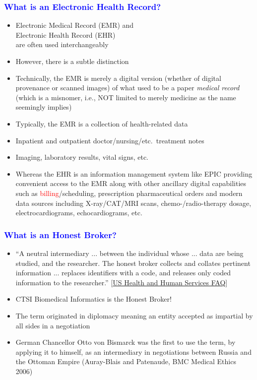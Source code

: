 \documentclass[11pt,pdftex,dvipsnames,usenames]{beamer}
\begin{document}
\begin{frame}[fragile]\frametitle{\bf\textcolor{blue}{What is an Electronic Health Record?}}

\begin{itemize}
\item Electronic Medical Record (EMR) and\\ 
Electronic Health Record (EHR)\\
are often used interchangeably
\item However, there is a subtle distinction
\item Technically, the EMR is merely a digital version (whether of
  digital provenance or scanned images) of what used to be a paper
  {\it medical record} (which is a misnomer, i.e., NOT limited to
  merely medicine as the name seemingly implies)
\item Typically, the EMR is a collection of health-related data
\item Inpatient and outpatient doctor/nursing/etc.\ treatment notes
\item Imaging, laboratory results, vital signs, etc. 
\item Whereas the EHR is an information management system like EPIC
  providing convenient access to the EMR along with other ancillary
  digital capabilities such as \textcolor{red}{billing}/scheduling,
  prescription pharmaceutical orders and modern data sources 
including X-ray/CAT/MRI scans,  chemo-/radio-therapy dosage,
  electrocardiograms, echocardiograms, etc.
\end{itemize}

\end{frame}


\begin{frame}[fragile]\frametitle{\bf\textcolor{blue}{What is an Honest Broker?}}

\begin{itemize}
\item
``A neutral intermediary ... between the individual whose ... data are being studied, and the researcher. The honest broker collects and collates pertinent information ... replaces identifiers with a code, and releases only coded information to the researcher.''
 \textcolor{PineGreen}{[\href{https://www.hhs.gov/ohrp/sachrp-committee/recommendations/2011-october-13-letter-attachment-d/index.html}{US
     Health and Human Services FAQ}]}
\item CTSI Biomedical Informatics is the Honest Broker!
\item The term originated in diplomacy meaning an entity
accepted as impartial by all sides in a negotiation
\item German Chancellor Otto von Bismarck was the first to use the
  term, by applying it to himself, as an intermediary in negotiations
  between Russia and the Ottoman Empire (Auray-Blais and Patenaude,
  BMC Medical Ethics 2006)
\end{itemize}

\end{frame}
\end{document}
